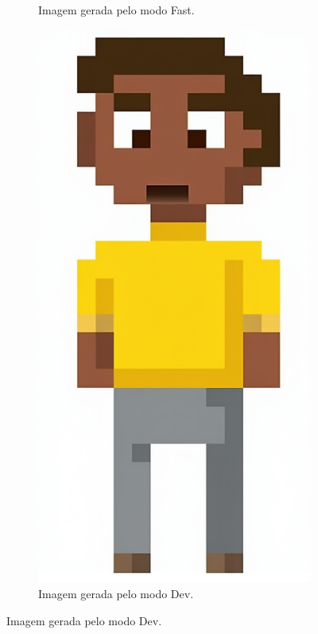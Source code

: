 \begin{figure}[htbp]
\begin{subfigure}{0.2\linewidth}
        \caption{\small Imagem gerada pelo modo Fast.}
        \label{fig:cgDream3e}
    \end{subfigure}
    \begin{subfigure}{0.2\linewidth}
        \includegraphics[width=1\linewidth]{figs/cgDream/res_img_FluxDev2.png}
        \caption{\small Imagem gerada pelo modo Dev.}
        \label{fig:cgDream3f}
    \end{subfigure}
\end{figure}

